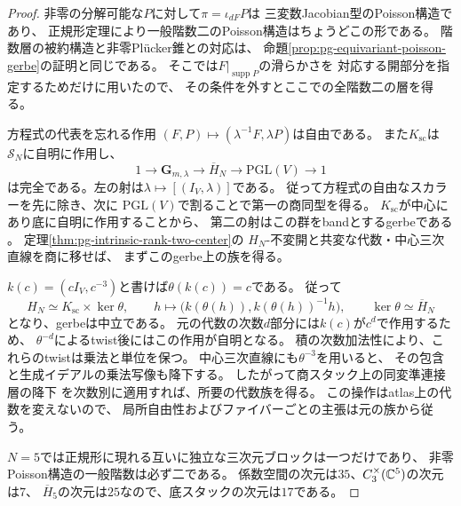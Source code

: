 \begin{proof}
非零の分解可能な$P$に対して$\pi=\iota_{dF}P$は
三変数Jacobian型のPoisson構造であり、
正規形定理により一般階数二のPoisson構造はちょうどこの形である。
階数層の被約構造と非零Pl\"ucker錐との対応は、
命題\ref{prop:pg-equivariant-poisson-gerbe}の証明と同じである。
そこでは$F|_{\operatorname{supp}P}$の滑らかさを
対応する開部分を指定するためだけに用いたので、
その条件を外すとここでの全階数二の層を得る。

方程式の代表を忘れる作用
$(F,P)\mapsto(\lambda^{-1}F,\lambda P)$は自由である。
また$K_{\mathrm{sc}}$は$\mathcal S_N$に自明に作用し、
\begin{equation}
 1\longrightarrow\mathbf G_{m,\lambda}
 \longrightarrow\overline H_N
 \longrightarrow\mathrm{PGL}(V)\longrightarrow1
 \label{eq:pg-intrinsic-effective-group}
\end{equation}
は完全である。左の射は$\lambda\mapsto[(I_V,\lambda)]$である。
従って方程式の自由なスカラーを先に除き、次に
$\mathrm{PGL}(V)$で割ることで第一の商同型を得る。
$K_{\mathrm{sc}}$が中心にあり底に自明に作用することから、
第二の射はこの群をbandとするgerbeである
\cite[Lemma~78.27.1, Tag~\texttt{06PD}]{PStacks}。
定理\ref{thm:pg-intrinsic-rank-two-center}の
$H_N$-不変開と共変な代数・中心三次直線を商に移せば、
まずこのgerbe上の族を得る。

$k(c)=(cI_V,c^{-3})$と書けば$\theta(k(c))=c$である。
従って
\begin{equation}
 H_N\simeq K_{\mathrm{sc}}\times\ker\theta,
 \qquad
 h\longmapsto
 \bigl(k(\theta(h)),k(\theta(h))^{-1}h\bigr),
 \qquad
 \ker\theta\simeq\overline H_N
 \label{eq:pg-intrinsic-character-splitting}
\end{equation}
となり、gerbeは中立である。
元の代数の次数$d$部分には$k(c)$が$c^d$で作用するため、
$\theta^{-d}$によるtwist後にはこの作用が自明となる。
積の次数加法性により、これらのtwistは乗法と単位を保つ。
中心三次直線にも$\theta^{-3}$を用いると、
その包含と生成イデアルの乗法写像も降下する。
したがって商スタック上の同変準連接層の降下
\cite[Proposition~96.14.3, Tag~\texttt{06WT}]{PStacks}
を次数別に適用すれば、所要の代数族を得る。
この操作はatlas上の代数を変えないので、
局所自由性およびファイバーごとの主張は元の族から従う。

$N=5$では正規形に現れる互いに独立な三次元ブロックは一つだけであり、
非零Poisson構造の一般階数は必ず二である。
係数空間の次元は$35$、$C_3^\times(\mathbb C^5)$の次元は$7$、
$\overline H_5$の次元は$25$なので、底スタックの次元は$17$である。
\end{proof}

